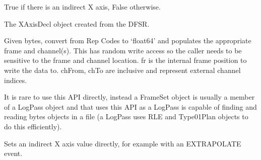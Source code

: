 \documentclass[letterpaper,10pt,english]{sphinxmanual}
\begin{document}
\begin{fulllineitems}
\begin{fulllineitems}
\end{fulllineitems}


\begin{fulllineitems}
\label{\detokenize{ref/LIS/core/FrameSet:TotalDepth.LIS.core.FrameSet.FrameSet.isIndirectX}}
True if there is an indirect X axis, False otherwise.

\end{fulllineitems}


\begin{fulllineitems}
\label{\detokenize{ref/LIS/core/FrameSet:TotalDepth.LIS.core.FrameSet.FrameSet.xAxisDecl}}
The XAxisDecl object created from the DFSR.

\end{fulllineitems}


\begin{fulllineitems}
\label{\detokenize{ref/LIS/core/FrameSet:TotalDepth.LIS.core.FrameSet.FrameSet.setFrameBytes}}
Given bytes, convert from Rep Codes to ‘float64’ and populates the
appropriate frame and channel(s). This has random write access so the
caller needs to be sensitive to the frame and channel location.
fr is the internal frame position to write the data to.
chFrom, chTo are inclusive and represent external channel indices.

 It is rare to use this API directly, instead a FrameSet object
is usually a member of a LogPass object and that uses this API as a LogPass is
capable of finding and reading bytes objects in a file (a LogPass uses
RLE and Type01Plan objects to do this efficiently).

\end{fulllineitems}


\begin{fulllineitems}
\label{\detokenize{ref/LIS/core/FrameSet:TotalDepth.LIS.core.FrameSet.FrameSet.setIndirectX}}
Sets an indirect X axis value directly, for example with an EXTRAPOLATE event.


\end{fulllineitems}
\end{fulllineitems}
\end{document}
